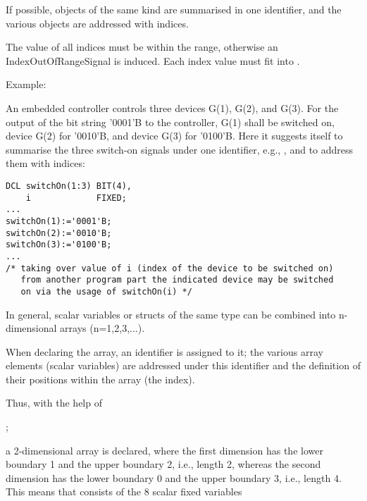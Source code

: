 If possible, objects of the same kind are summarised in
one identifier, and the various objects are addressed with indices.

The value of all indices must be within the range, otherwise
an IndexOutOfRangeSignal is induced.
Each index value must fit into . 

Example:

An embedded controller controls three devices G(1), G(2), and G(3). For
the output of the bit string '0001'B to the controller, G(1) shall be
switched on, device G(2) for '0010'B, and device G(3) for '0100'B. Here it
suggests itself to summarise the three switch-on signals under one
identifier, e.g., , and to address them with indices:

\begin{lstlisting}
DCL switchOn(1:3) BIT(4),
    i             FIXED;
...
switchOn(1):='0001'B;
switchOn(2):='0010'B;
switchOn(3):='0100'B;
...
/* taking over value of i (index of the device to be switched on)
   from another program part the indicated device may be switched
   on via the usage of switchOn(i) */
\end{lstlisting}

In general, scalar variables
 or structs
of the same type can be combined into
n-dimensional arrays (n=1,2,3,...).

When declaring the array, an identifier is assigned to it; the various
array elements (scalar variables) are addressed under this identifier
and the definition of their positions within the array (the index).

Thus, with the help of

  ;

a 2-dimensional array is declared, where the first dimension has the
lower boundary 1 and the upper boundary 2, i.e., length 2, whereas the
second dimension has the lower boundary 0 and the upper boundary 3,
i.e., length 4.  This means that  consists of the 8 scalar fixed
variables

 \x {} \x 
     \x {} \\
 \x {} \x
     \x {}

